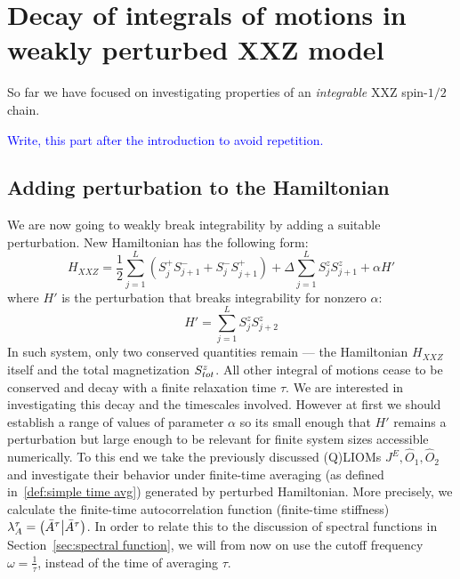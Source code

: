 \chapter{Decay of integrals of motions in weakly perturbed XXZ model}
\thispagestyle{chapterBeginStyle}

So far we have focused on investigating properties of an \textit{integrable} XXZ
spin-\(1/2\) chain. 

\textcolor{blue}{Write, this part after the introduction to avoid repetition.}


\section{Adding perturbation to the Hamiltonian}
We are now going to weakly break integrability by adding a suitable perturbation.
New Hamiltonian has the following form:
\begin{equation}
    H_{XXZ} = \frac{1}{2}\sum_{j = 1}^{L}\left( S^{+}_{j} S^{-}_{j+1} + 
    S^{-}_{j}S^{+}_{j+1} \right) + \Delta\sum_{j = 1}^{L} S^{z}_{j}S^{z}_{j+1}
    + \alpha H'
    \label{eq:HXXZ perturbed}
\end{equation}
where \(H'\) is the perturbation that breaks integrability for nonzero \(\alpha \):
\begin{equation}
    H'=\sum_{j = 1}^{L} S^{z}_{j}S^{z}_{j+2}
    \label{eq:perturbation}
\end{equation}
In such system, only two conserved quantities remain --- the Hamiltonian \(H_{XXZ}\) itself 
and the total magnetization \(S^{z}_{tot}\). All other integral of motions cease to be conserved
and decay with a finite relaxation time \(\tau\). We are interested in investigating this
decay and the timescales involved. However at first we should establish a range of
values of parameter \(\alpha\) so its small enough that \(H'\) remains a perturbation
but large enough to be relevant for finite system sizes accessible numerically. 
To this end we take the previously discussed (Q)LIOMs  \(J^E, \hat{O}_1,\hat{O}_2\)
and investigate their behavior under finite-time averaging (as defined in~\eqref{def:simple time avg})
generated by perturbed Hamiltonian. More precisely, we calculate the finite-time autocorrelation
function (finite-time stiffness) \(\lambda^{\tau}_A = \left(\bar{A}^{\tau} \middle| \bar{A}^{\tau}\right)\).
In order to relate this to the discussion of spectral functions in Section~\ref{sec:spectral function},
we will from now on use the cutoff frequency \(\omega = \frac{1}{\tau}\), instead of the time of
averaging \(\tau\).









